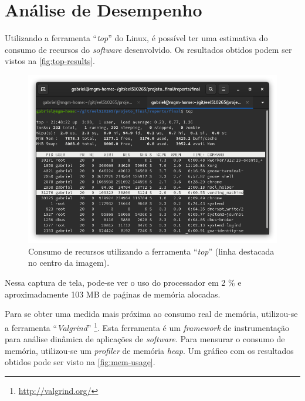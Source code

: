 %
%
%
%
%

%
%
%
%
%

\section{Análise de Desempenho} \label{sec:performance-analysis}

Utilizando a ferramenta ``\textit{top}'' do Linux, é possível ter uma estimativa do consumo de recursos do \textit{software} desenvolvido. Os resultados obtidos podem ser vistos na \autoref{fig:top-results}.

\begin{figure}[!ht]
    \begin{center}
        \includegraphics[width=\textwidth]{figures/top-output.png}
        \caption{Consumo de recursos utilizando a ferramenta ``\textit{top}'' (linha destacada no centro da imagem).}
        \label{fig:top-results}
    \end{center}
\end{figure}

Nessa captura de tela, pode-se ver o uso do processador em 2 \% e aproximadamente 103 MB de paǵinas de memória alocadas.

Para se obter uma medida mais próxima ao consumo real de memória, utilizou-se a ferramenta ``\textit{Valgrind}'' \footnote{\href{http://valgrind.org/}{http://valgrind.org/}}. Esta ferramenta é um \textit{framework} de instrumentação para análise dinâmica de aplicações de \textit{software}. Para mensurar o consumo de memória, utilizou-se um \textit{profiler} de memória \textit{heap}. Um gráfico com os resultados obtidos pode ser visto na \autoref{fig:mem-usage}.

